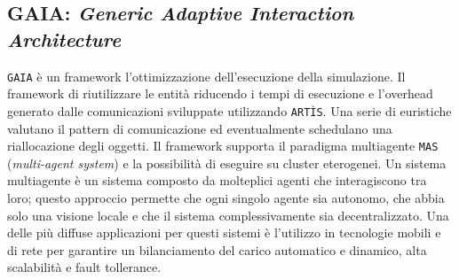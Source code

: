 \subsection{GAIA: \textit{Generic Adaptive Interaction Architecture}}
\texttt{GAIA}\cite{padssite} è un framework l'ottimizzazione dell'esecuzione della simulazione. Il framework di riutilizzare le entità riducendo i tempi di esecuzione e l'overhead generato dalle comunicazioni sviluppate utilizzando \texttt{ARTÌS}.\newline
Una serie di euristiche valutano il pattern di comunicazione ed eventualmente schedulano una riallocazione degli oggetti.
Il framework supporta il paradigma  multiagente \texttt{MAS} (\textit{multi-agent system}) e la possibilità di eseguire su cluster eterogenei.
Un sistema multiagente è un sistema composto da molteplici agenti che interagiscono tra loro; questo approccio permette che ogni singolo agente sia autonomo, che abbia solo una visione locale e che il sistema complessivamente sia decentralizzato. Una delle più diffuse applicazioni per questi sistemi è l'utilizzo in tecnologie mobili e di rete per garantire un bilanciamento del carico automatico e dinamico, alta scalabilità e fault tollerance.

